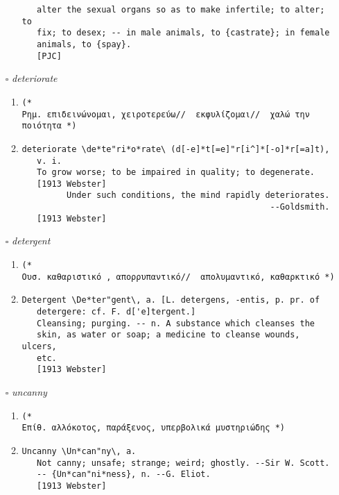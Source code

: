 \documentclass{article}
\begin{document}
\begin{itemize}
\begin{enumerate}
{\begin{lstlisting}
   alter the sexual organs so as to make infertile; to alter; to
   fix; to desex; -- in male animals, to {castrate}; in female
   animals, to {spay}.
   [PJC]
\end{lstlisting}}
\end{enumerate}
\item[$\square$] \emph{ deteriorate }
\begin{enumerate}
\item{
\begin{lstlisting}
(* 
Ρημ. επιδεινώνομαι, χειροτερεύω//  εκφυλίζομαι//  χαλώ την ποιότητα *)
\end{lstlisting}}
\item{
\begin{lstlisting}
deteriorate \de*te"ri*o*rate\ (d[-e]*t[=e]"r[i^]*[-o]*r[=a]t),
   v. i.
   To grow worse; to be impaired in quality; to degenerate.
   [1913 Webster]
         Under such conditions, the mind rapidly deteriorates.
                                                  --Goldsmith.
   [1913 Webster]
\end{lstlisting}}
\end{enumerate}
\item[$\square$] \emph{ detergent }
\begin{enumerate}
\item{
\begin{lstlisting}
(* 
Ουσ. καθαριστικό , απορρυπαντικό//  απολυμαντικό, καθαρκτικό *)
\end{lstlisting}}
\item{
\begin{lstlisting}
Detergent \De*ter"gent\, a. [L. detergens, -entis, p. pr. of
   detergere: cf. F. d['e]tergent.]
   Cleansing; purging. -- n. A substance which cleanses the
   skin, as water or soap; a medicine to cleanse wounds, ulcers,
   etc.
   [1913 Webster]
\end{lstlisting}}
\end{enumerate}
\item[$\square$] \emph{ uncanny }
\begin{enumerate}
\item{
\begin{lstlisting}
(* 
Επίθ. αλλόκοτος, παράξενος, υπερβολικά μυστηριώδης *)
\end{lstlisting}}
\item{
\begin{lstlisting}
Uncanny \Un*can"ny\, a.
   Not canny; unsafe; strange; weird; ghostly. --Sir W. Scott.
   -- {Un*can"ni*ness}, n. --G. Eliot.
   [1913 Webster]
\end{lstlisting}}
\end{enumerate}


\end{itemize}
\end{document}
